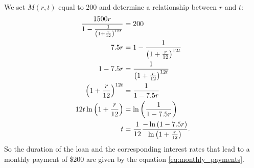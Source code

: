 \begin{activitySolution}
    \item We set $M(r,t)$ equal to 200 and determine a relationship between $r$ and $t$:
\begin{align}
\frac{1500r}{1-\frac{1}{\left(1+\frac{r}{12}\right)^{12t}}} &= 200 \notag \\
7.5r &= 1-\frac{1}{\left(1+\frac{r}{12}\right)^{12t}} \notag \\
1-7.5r &= \frac{1}{\left(1+\frac{r}{12}\right)^{12t}} \notag \\
\left(1+\frac{r}{12}\right)^{12t} &= \frac{1}{1-7.5r} \notag \\
12t \ln\left(1+\frac{r}{12}\right) &= \ln\left(\frac{1}{1-7.5r}\right) \notag \\
t &= \frac{1}{12}\frac{-\ln\left(1-7.5r\right)}{\ln\left(1+\frac{r}{12}\right)}. \label{eq:monthly_payments} 
\end{align}
So the duration of the loan and the corresponding interest rates that lead to a monthly payment of \$200 are given by the equation \ref{eq:monthly_payments}.
    \ea
\end{activitySolution}
\afterpa 